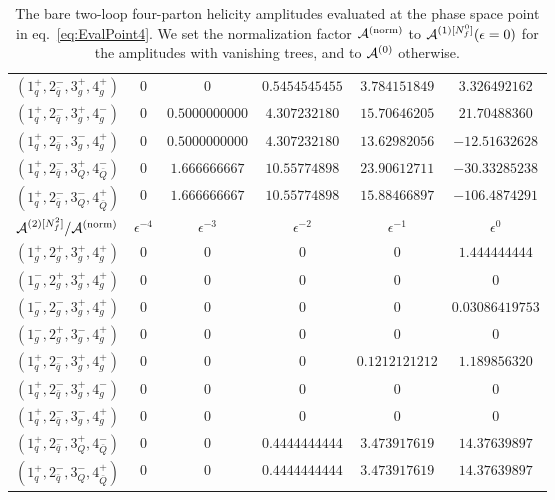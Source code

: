 \begin{table}[h]
\begin{adjustbox}{width=1\textwidth}
\begin{tabular}{cccccc}
      \midrule
      $( 1_q^+, 2_{\bar q}^-, 3_g^+, 4_g^+ )$ & 0 & 0 & $0.5454545455$ & $3.784151849$ & $3.326492162$ \\
      $( 1_q^+, 2_{\bar q}^-, 3_g^+, 4_g^- )$ & 0 & $0.5000000000$ & $4.307232180$ & $15.70646205$ & $21.70488360$ \\
      $( 1_q^+, 2_{\bar q}^-, 3_g^-, 4_g^+ )$ & 0 & $0.5000000000$ & $4.307232180$ & $13.62982056$ & $-12.51632628$ \\
      \midrule
      $( 1_q^+, 2_{\bar q}^-, 3_Q^+, 4_{\bar Q}^- )$ & 0 & $1.666666667$ & $10.55774898$ & $23.90612711$ & $-30.33285238$ \\
      $( 1_q^+, 2_{\bar q}^-, 3_Q^-, 4_{\bar Q}^+ )$ & 0 & $1.666666667$ & $10.55774898$ & $15.88466897$ & $-106.4874291$ \\
      \toprule
      $\mathcal{A}^{(2)[N_f^2]}/\mathcal{A}^\mathrm{(norm)}$	  &   $\epsilon^{-4}$   &   $\epsilon^{-3}$   &   $\epsilon^{-2}$   &   $\epsilon^{-1}$   &   $\epsilon^{0}$   \\
      \midrule
      $( 1_g^+, 2_g^+, 3_g^+, 4_g^+ )$ & 0 & 0 & 0 & 0 & $1.444444444$ \\
      $( 1_g^-, 2_g^+, 3_g^+, 4_g^+ )$ & 0 & 0 & 0 & 0 & $0$ \\
      $( 1_g^-, 2_g^-, 3_g^+, 4_g^+ )$ & 0 & 0 & 0 & 0 & $0.03086419753$ \\
      $( 1_g^-, 2_g^+, 3_g^-, 4_g^+ )$ & 0 & 0 & 0 & 0 & $0$ \\
      \midrule
      $( 1_q^+, 2_{\bar q}^-, 3_g^+, 4_g^+ )$ & 0 & 0 & 0 & $0.1212121212$ & $1.189856320$ \\
      $( 1_q^+, 2_{\bar q}^-, 3_g^+, 4_g^- )$ & 0 & 0 & 0 & 0 & $0$ \\
      $( 1_q^+, 2_{\bar q}^-, 3_g^-, 4_g^+ )$ & 0 & 0 & 0 & 0 & $0$ \\
      \midrule
      $( 1_q^+, 2_{\bar q}^-, 3_Q^+, 4_{\bar Q}^- )$ & 0 & 0 & $0.4444444444$ & $3.473917619$ & $14.37639897$ \\
      $( 1_q^+, 2_{\bar q}^-, 3_Q^-, 4_{\bar Q}^+ )$ & 0 & 0 & $0.4444444444$ & $3.473917619$ & $14.37639897$ \\
      \bottomrule
    \end{tabular}
  \end{adjustbox}
  \caption{The bare two-loop four-parton helicity amplitudes evaluated
    at the phase space point in eq.~\eqref{eq:EvalPoint4}. We set the
    normalization factor $\mathcal{A}^\mathrm{(norm)}$ to $\mathcal{A}^{(1)[N_f^0]}(\epsilon=0)$ for the
    amplitudes with vanishing trees, and to $\mathcal{A}^{(0)}$ otherwise.} 
  \label{tab:results4parton}
\end{table}

